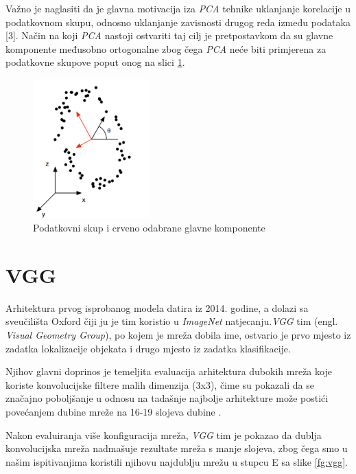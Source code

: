 \documentclass[times, utf8, proizvoljni, numeric]{fer}
\begin{document}
Važno je naglasiti da je glavna motivacija iza \textit{PCA} tehnike uklanjanje korelacije u podatkovnom skupu, odnosno uklanjanje zavisnosti drugog reda između podataka [3]. Način na koji \textit{PCA} nastoji ostvariti taj cilj je pretpostavkom da su glavne komponente međusobno ortogonalne zbog čega \textit{PCA} neće biti primjerena za podatkovne skupove poput onog na slici \ref{fg:pca_problem}.

\begin{figure}[H]
	\begin{center}
		\captionsetup{justification=centering}
		\includegraphics[width=0.4\textwidth]{./imgs/pca_problem.png}
		\caption{Podatkovni skup i crveno odabrane glavne komponente \cite{PCA}}
		\label{fg:pca_problem}
	\end{center}
\end{figure}


\section{VGG}

Arhitektura prvog isprobanog modela datira iz 2014. godine, a dolazi sa sveučilišta Oxford čiji ju je tim koristio u \textit{ImageNet} natjecanju.\textit{VGG} tim (engl. \textit{Visual Geometry Group}), po kojem je mreža dobila ime, ostvario je prvo mjesto iz zadatka lokalizacije objekata i drugo mjesto iz zadatka klasifikacije.

Njihov glavni doprinos je temeljita evaluacija arhitektura dubokih mreža koje koriste konvolucijske filtere malih dimenzija (3x3), čime su pokazali da se značajno poboljšanje u odnosu na tadašnje najbolje arhitekture može postići povećanjem dubine mreže na 16-19 slojeva dubine \cite{VGG}. 

Nakon evaluiranja više konfiguracija mreža, \textit{VGG} tim je pokazao da dublja konvolucijska mreža nadmašuje rezultate mreža s manje slojeva, zbog čega smo u našim ispitivanjima koristili njihovu najdublju mrežu u stupcu E sa slike \ref{fg:vgg}.
\end{document}

